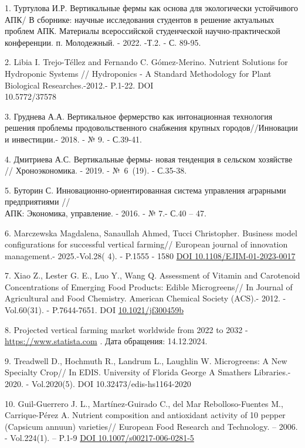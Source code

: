 \begin{references}
1. Туртулова И.Р. Вертикальные фермы как основа для экологически
устойчивого АПК\textsc{/ В} сборнике: научные исследования студентов в
решение актуальных проблем АПК. Материалы всероссийской студенческой
научно-практической конференции. п. Молодежный. - 2022. -Т.2. - С.
89-95.

2. Libia I. Trejo-Téllez and Fernando C. Gómez-Merino. Nutrient Solutions
for Hydroponic Systems // Hydroponics - A Standard Methodology for Plant
Biological Researches.-2012.- P.1-22. DOI \\10.5772/37578

3. Груднева А.А. Вертикальное фермерство как интонационная технология
решения проблемы продовольственного снабжения крупных городов//Инновации
и инвестиции.- 2018. - № 9. - С.39-41.

4. Дмитриева А.С. Вертикальные фермы- новая тенденция в сельском
хозяйстве // Хроноэкономика. - 2019. - №~6~(19). - С.35-38.

5. Буторин С. Инновационно-ориентированная система управления аграрными
предприятиями // \\АПК: Экономика, управление. - 2016. - № 7.- С.40 -- 47.

6. Marczewska Magdalena, Sanaullah Ahmed, Tucci Christopher. Business
model configurations for suc\-cessful vertical farming// European journal
of innovation management.- 2025.-Vol.28( 4). - P.1555 - 1580
\href{http://dx.doi.org/10.1108/EJIM-01-2023-0017}{DOI 10.1108/EJIM-01-2023-0017}

7. Xiao Z., Lester G. E., Luo Y., Wang Q. Assessment of Vitamin and
Carotenoid Concentrations of Emerging Food Products: Edible
Microgreens// In Journal of Agricultural and Food Chemistry. American
Chemical Society (ACS).- 2012. -Vol.60(31). - P.7644-7651. DOI
\href{https://doi.org/10.1021/jf300459b}{10.1021/jf300459b}

8. Projected vertical farming market worldwide from 2022 to 2032 -
\href{https://www.statista.com/statistics/487666/projection-vertical-farming-market-worldwide/}{https://www.statista.com}
. Дата обращения: 14.12.2024.

9. Treadwell D., Hochmuth R., Landrum L., Laughlin W. Microgreens: A New
Specialty Crop// In EDIS. University of Florida George A Smathers
Libraries.- 2020. - Vol.2020(5). DOI 10.32473/edis-hs1164-2020

10. Guil-Guerrero J. L., Martínez-Guirado C., del Mar Rebolloso-Fuentes
M., Carrique-Pérez A. Nutrient composition and antioxidant activity of
10 pepper (Capsicum annuun) varieties// European Food Research and
Technology. -- 2006. - Vol.224(1). -- P.1-9
\href{https://doi.org/10.1007/s00217-006-0281-5}{DOI
10.1007/s00217-006-0281-5}


\end{references}

